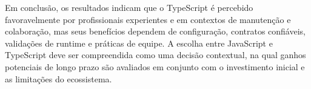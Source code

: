 Em conclusão, os resultados indicam que o TypeScript é percebido favoravelmente por profissionais experientes e em contextos de manutenção e colaboração, mas seus benefícios dependem de configuração, contratos confiáveis, validações de runtime e práticas de equipe. A escolha entre JavaScript e TypeScript deve ser compreendida como uma decisão contextual, na qual ganhos potenciais de longo prazo são avaliados em conjunto com o investimento inicial e as limitações do ecossistema.
